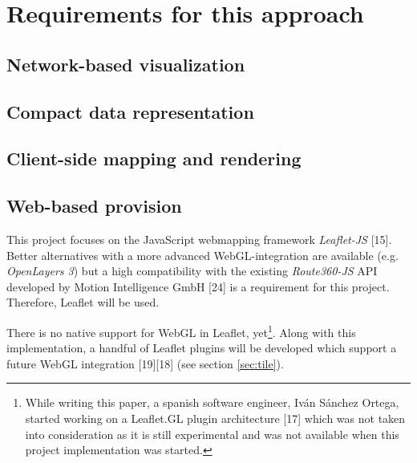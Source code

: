 
\cleardoublepage              %
\chapter{Requirements for this approach}
  \section{Network-based visualization}
  \section{Compact data representation}
  \section{Client-side mapping and rendering}
  \section{Web-based provision}
    This project focuses on the JavaScript webmapping framework \textit{Leaflet-JS} [15]. Better alternatives with a more advanced WebGL-integration are available (e.g. \textit{OpenLayers 3}) but a high compatibility with the existing \textit{Route360-JS} API developed by Motion Intelligence GmbH [24] is a requirement for this project. Therefore, Leaflet will be used.\par
    There is no native support for WebGL in Leaflet, yet\footnote{While writing this paper, a spanish software engineer, Iván Sánchez Ortega, started working on a Leaflet.GL plugin architecture [17] which was not taken into consideration as it is still experimental and was not available when this project implementation was started.}. Along with this implementation, a handful of Leaflet plugins will be developed which support a future WebGL integration [19][18] (see section \ref{sec:tile}).\par
